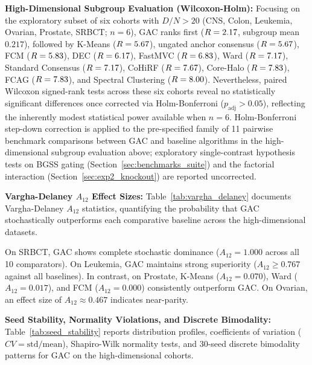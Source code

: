 \documentclass[pdflatex,sn-mathphys-num]{sn-jnl}
\theoremstyle{thmstyleone}
\theoremstyle{thmstyletwo}
\theoremstyle{thmstylethree}
\begin{document}
\textbf{High-Dimensional Subgroup Evaluation (Wilcoxon-Holm):}
Focusing on the exploratory subset of six cohorts with $D/N > 20$ (CNS, Colon, Leukemia, Ovarian, Prostate, SRBCT; $n=6$), GAC ranks first ($R = 2.17$, subgroup mean $0.217$), followed by K-Means ($R = 5.67$), ungated anchor consensus ($R = 5.67$), FCM ($R = 5.83$), DEC ($R = 6.17$), FastMVC ($R = 6.83$), Ward ($R = 7.17$), Standard Consensus ($R = 7.17$), CoHiRF ($R = 7.67$), Core-Halo ($R = 7.83$), FCAG ($R = 7.83$), and Spectral Clustering ($R = 8.00$). Nevertheless, paired Wilcoxon signed-rank tests across these six cohorts reveal no statistically significant differences once corrected via Holm-Bonferroni ($p_{\text{adj}} > 0.05$), reflecting the inherently modest statistical power available when $n=6$. Holm-Bonferroni step-down correction is applied to the pre-specified family of 11 pairwise benchmark comparisons between GAC and baseline algorithms in the high-dimensional subgroup evaluation above; exploratory single-contrast hypothesis tests on BGSS gating (Section~\ref{sec:benchmarks_suite}) and the factorial interaction (Section~\ref{sec:exp2_knockout}) are reported uncorrected.

\textbf{Vargha-Delaney $A_{12}$ Effect Sizes:}
Table~\ref{tab:vargha_delaney} documents Vargha-Delaney $A_{12}$ statistics, quantifying the probability that GAC stochastically outperforms each comparative baseline across the high-dimensional datasets.



On SRBCT, GAC shows complete stochastic dominance ($A_{12} = 1.000$ across all 10 comparators). On Leukemia, GAC maintains strong superiority ($A_{12} \ge 0.767$ against all baselines). In contrast, on Prostate, K-Means ($A_{12} = 0.070$), Ward ($A_{12} = 0.017$), and FCM ($A_{12} = 0.000$) consistently outperform GAC. On Ovarian, an effect size of $A_{12} \approx 0.467$ indicates near-parity.

\textbf{Seed Stability, Normality Violations, and Discrete Bimodality:}\label{sec:stats_normality}
Table~\ref{tab:seed_stability} reports distribution profiles, coefficients of variation ($CV = \text{std}/\text{mean}$), Shapiro-Wilk normality tests, and 30-seed discrete bimodality patterns for GAC on the high-dimensional cohorts.
\end{document}
